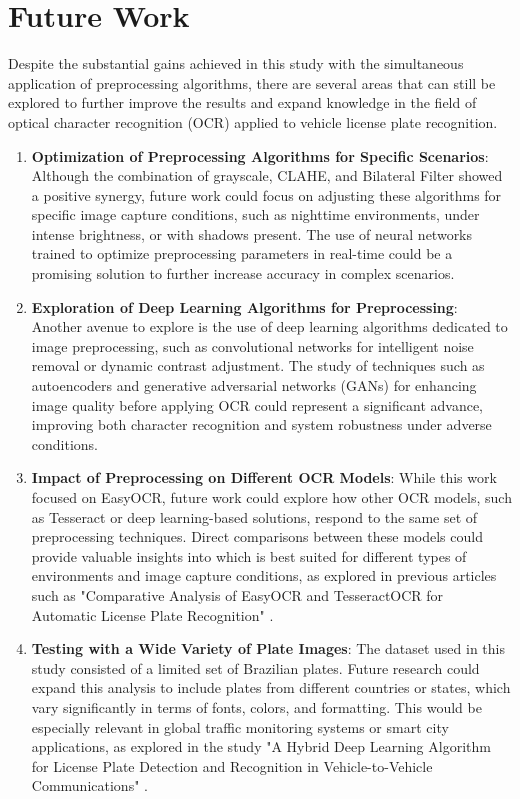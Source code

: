 \documentclass[conference]{IEEEtran}
\begin{document}
	\section{Future Work}
	
	Despite the substantial gains achieved in this study with the simultaneous application of preprocessing algorithms, there are several areas that can still be explored to further improve the results and expand knowledge in the field of optical character recognition (OCR) applied to vehicle license plate recognition.
	
	
	\begin{enumerate}
		\item \textbf{Optimization of Preprocessing Algorithms for Specific Scenarios}: Although the combination of grayscale, CLAHE, and Bilateral Filter showed a positive synergy, future work could focus on adjusting these algorithms for specific image capture conditions, such as nighttime environments, under intense brightness, or with shadows present. The use of neural networks trained to optimize preprocessing parameters in real-time could be a promising solution to further increase accuracy in complex scenarios.
		\item \textbf{Exploration of Deep Learning Algorithms for Preprocessing}: Another avenue to explore is the use of deep learning algorithms dedicated to image preprocessing, such as convolutional networks for intelligent noise removal or dynamic contrast adjustment. The study of techniques such as autoencoders and generative adversarial networks (GANs) for enhancing image quality before applying OCR could represent a significant advance, improving both character recognition and system robustness under adverse conditions.
		\item \textbf{Impact of Preprocessing on Different OCR Models}: While this work focused on EasyOCR, future work could explore how other OCR models, such as Tesseract or deep learning-based solutions, respond to the same set of preprocessing techniques. Direct comparisons between these models could provide valuable insights into which is best suited for different types of environments and image capture conditions, as explored in previous articles such as "Comparative Analysis of EasyOCR and TesseractOCR for Automatic License Plate Recognition" \cite{b1}.
		\item \textbf{Testing with a Wide Variety of Plate Images}: The dataset used in this study consisted of a limited set of Brazilian plates. Future research could expand this analysis to include plates from different countries or states, which vary significantly in terms of fonts, colors, and formatting. This would be especially relevant in global traffic monitoring systems or smart city applications, as explored in the study "A Hybrid Deep Learning Algorithm for License Plate Detection and Recognition in Vehicle-to-Vehicle Communications" \cite{b7}.

\end{enumerate}
\end{document}
